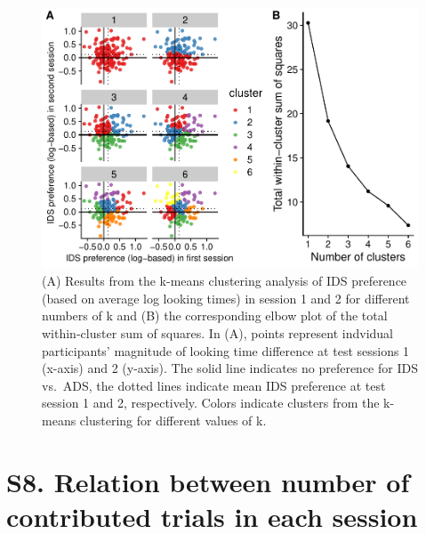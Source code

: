 \documentclass[
  man, donotrepeattitle,floatsintext]{apa6}
\begin{document}
\begin{figure}
\centering
\includegraphics{MB1T_supplement_files/figure-latex/fig8-1.pdf}
\caption{\label{fig:fig8} (A) Results from the k-means clustering analysis of IDS preference (based on average log looking times) in session 1 and 2 for different numbers of k and (B) the corresponding elbow plot of the total within-cluster sum of squares. In (A), points represent indvidual participants' magnitude of looking time difference at test sessions 1 (x-axis) and 2 (y-axis). The solid line indicates no preference for IDS vs.~ADS, the dotted lines indicate mean IDS preference at test session 1 and 2, respectively. Colors indicate clusters from the k-means clustering for different values of k.}
\end{figure}

\newpage

\hypertarget{s8.-relation-between-number-of-contributed-trials-in-each-session}{%
\section{S8. Relation between number of contributed trials in each session}\label{s8.-relation-between-number-of-contributed-trials-in-each-session}}
\end{document}
